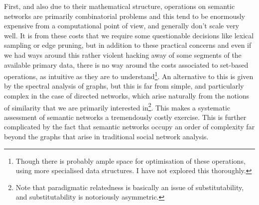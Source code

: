 First, and also due to their mathematical structure, operations on semantic networks are primarily combinatorial problems and this tend to be enormously expensive from a computational point of view, and generally don't scale very well.
It is from these costs that we require some questionable decisions like lexical sampling or edge pruning, but in addition to these practical concerns and even if we had ways around this rather violent hacking away of some segments of the available primary data, there is no way around the costs associated to set-based operations, as intuitive as they are to understand\footnote{
    Though there is probably ample space for optimisation of these operations, using more specialised data structures.
    I have not explored this thoroughly.
}.
An alternative to this is given by the spectral analysis of graphs, but this is far from simple, and particularly complex in the case of directed networks, which arise naturally from the notions of similarity that we are primarily interested in\footnote{
    Note that paradigmatic relatedness is basically an issue of substitutability, and substitutability is notoriously asymmetric.
}.
This makes a systematic assessment of semantic networks a tremendously costly exercise.
This is further complicated by the fact that semantic networks occupy an order of complexity far beyond the graphs that arise in traditional social network analysis.

